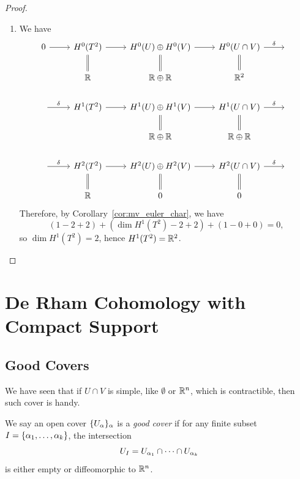 \begin{proof}
\begin{enumerate}[label=({\itshape \arabic*})]
\[        \ker\delta = \im j = \R, \quad \im\delta = H^2(T^2).
    \] Hence, rank-nullity theorem gives \[
        2 = \dim \R\oplus\R = \dim\im\delta + \dim\ker\delta = \dim H^2(T^2) + 1,
    \] so \(\dim H^2(T^2) = 1\), hence \(H^2(T^2) = \R\).
    \item We have \[
        \begin{tikzcd}
            0 \ar{r}
            & H^0(T^2) \ar{r} \ar[equals]{d}
            & H^0(U)\oplus H^0(V) \ar{r} \ar[equals]{d}
            & H^0(U\cap V) \ar{r}{\delta} \ar[equals]{d} & \ \\
            & \R
            & \R\oplus\R
            & \R^2 \\
            \ar{r}{\delta} & H^1(T^2) \ar{r}
            & H^1(U)\oplus H^1(V) \ar{r} \ar[equals]{d}
            & H^1(U\cap V) \ar{r}{\delta} \ar[equals]{d} & \  \\
            & & \R\oplus\R
            & \R\oplus\R \\
            \ar{r}{\delta} & H^2(T^2) \ar{r} \ar[equals]{d}
            & H^2(U)\oplus H^2(V) \ar{r} \ar[equals]{d}
            & H^2(U\cap V) \ar{r}{\delta} \ar[equals]{d} & \  \\
            & \R
            & 0
            & 0
        \end{tikzcd}
    \]
    Therefore, by Corollary~\ref{cor:mv_euler_char}, we have \[
        (1 - 2 + 2) + (\dim H^1(T^2) - 2 + 2) + (1 - 0 + 0) = 0,
    \] so \(\dim H^1(T^2) = 2\), hence \(H^1(T^2) = \mathbb{R}^2\).
    \end{enumerate}
\end{proof}

\pagebreak

\section{De Rham Cohomology with Compact Support}

\subsection{Good Covers}

We have seen that if \(U\cap V\) is simple, like \(\emptyset\) or \(\mathbb{R}^n\), which is contractible, then such cover is handy.
\begin{definition}
    We say an open cover \(\{U_\alpha\}_\alpha\) is a \emph{good cover} if for any finite subset \(I = \{\alpha_1,\ldots,\alpha_k\}\), the intersection \[
        U_I = U_{\alpha_1}\cap\cdots\cap U_{\alpha_k}
    \] is either empty or diffeomorphic to \(\mathbb{R}^n\).
\end{definition}


